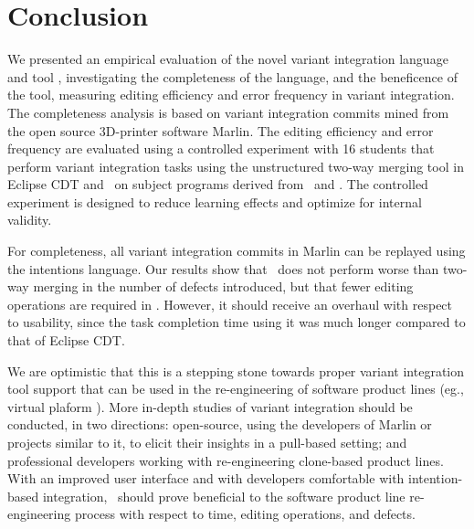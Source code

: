 \chapter{Conclusion}

We presented an empirical evaluation of the novel variant integration language and tool \tooln, investigating the completeness of the language, and the beneficence of the tool, measuring editing efficiency and error frequency in variant integration. The completeness analysis is based on variant integration commits mined from the open source 3D-printer software Marlin.
The editing efficiency and error frequency are evaluated using a controlled experiment with 16 students that perform variant integration tasks using the unstructured two-way merging tool in Eclipse CDT and \tooln~on subject programs derived from \busybox~and \vim. The controlled experiment is designed to reduce learning effects and optimize for internal validity.

For completeness, all variant integration commits in Marlin can be replayed using the intentions language. Our results show that \tooln~does not perform worse than two-way merging in the number of defects introduced, but that fewer editing operations are required in \tooln. However, it should receive an overhaul with respect to usability, since the task completion time using it was much longer compared to that of Eclipse CDT.

We are optimistic that this is a stepping stone towards proper variant integration tool support that can be used in the re-engineering of software product lines (eg., virtual plaform \cite{antkiewicz2014flexible}). More in-depth studies of variant integration should be conducted, in two directions: open-source, using the developers of Marlin or projects similar to it, to elicit their insights in a pull-based setting; and professional developers working with re-engineering clone-based product lines.
With an improved user interface and with developers comfortable with intention-based integration, \tooln~should prove beneficial to the software product line re-engineering process with respect to time, editing operations, and defects.

